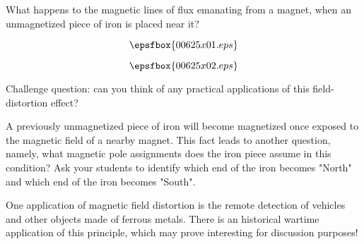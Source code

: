 

What happens to the magnetic lines of flux emanating from a magnet, when an unmagnetized piece of iron is placed near it?

$$\epsfbox{00625x01.eps}$$







$$\epsfbox{00625x02.eps}$$

\vskip 10pt

Challenge question: can you think of any practical applications of this field-distortion effect?







A previously unmagnetized piece of iron will become magnetized once exposed to the magnetic field of a nearby magnet.  This fact leads to another question, namely, what magnetic pole assignments does the iron piece assume in this condition?  Ask your students to identify which end of the iron becomes "North" and which end of the iron becomes "South".

One application of magnetic field distortion is the remote detection of vehicles and other objects made of ferrous metals.  There is an historical wartime application of this principle, which may prove interesting for discussion purposes!





